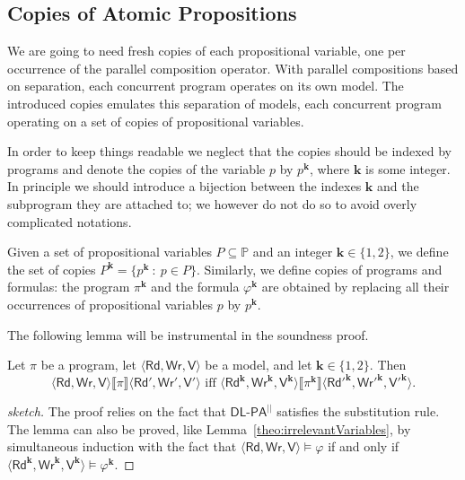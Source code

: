 \documentclass{llncs}
\newcommand{\cp}[2]{{#2}^\mathbf{#1}}
\newcommand{\pll}{ {||} }							%
\newcommand{\readset}{\mathsf{Rd}}
\newcommand{\valuset}{\mathsf{V}}
\newcommand{\writeset}{\mathsf{Wr}}
\newcommand{\DlpaPll}{\ensuremath{\mathsf{DL\text{-}PA}^\pll}\xspace}
\newcommand{\intPgm}[1]{\llbracket #1 \rrbracket}
\renewcommand{\phi}{\varphi}
\newcommand{\propset}{\mathbb P}
\newcommand{\propsetOf}[1]{\propset_{#1}}
\newcommand{\set}[1]{\{#1\}}
\newcommand{\suchthat}{~ : ~}
\newcommand{\tuple}[1]{ \langle #1 \rangle}
\begin{document}
\subsection{Copies of Atomic Propositions}\label{sec:copyVars}

We are going to need fresh copies of each propositional variable, one per occurrence of the parallel composition operator. 
With parallel compositions based on separation, each concurrent program operates on its own model.
The introduced copies emulates this separation of models,
each concurrent program operating on a set of copies of propositional variables.

In order to keep things readable we neglect that the copies should be indexed by programs
and denote the copies of the variable $p$ by $\cp k p$, where $\mathbf{k}$ is some integer. 
In principle we should introduce a bijection between the indexes $\mathbf{k}$ and the subprogram they are attached to;
we however do not do so to avoid overly complicated notations.

Given a set of propositional variables $P \subseteq \propset$ and an integer $\mathbf{k} \in \set{1,2}$, we define the set of copies
$\cp{k} P = \{ \cp{k} p \suchthat p \in P\}$. 
Similarly, we define copies of programs and formulas:
the program $\cp{k} \pi$ and the formula $\cp{k} \phi$ are obtained by replacing all their occurrences of
propositional variables $p$ by $\cp k p$. 

The following lemma will be instrumental in the soundness proof. 

\begin{lemma}\label{theo:copies}
Let $\pi$ be a program, 
let $\tuple{\readset,\writeset,\valuset}$ be a model, and 
let $\mathbf{k} \in \set{1,2}$. 
Then 
$$ \tuple{\readset,\writeset,\valuset} \intPgm{\pi} \tuple{\readset',\writeset',\valuset'} \text{ iff } 
\tuple{ \cp k {\readset},\cp k {\writeset},\cp k {\valuset}} \intPgm{\cp k \pi} \tuple{\cp k {\readset'},\cp k {\writeset'},\cp k {\valuset'}} . $$
\end{lemma}
\begin{proof}[sketch]
The proof relies on the fact that \DlpaPll satisfies the substitution rule.
The lemma can also be proved, like Lemma~\ref{theo:irrelevantVariables}, by simultaneous induction with the fact that
$\tuple{\readset, \writeset, \valuset} \models \phi$ if and only if
$\tuple{\cp k \readset, \cp k \writeset, \cp k \valuset} \models \cp k \phi$.
\end{proof}
\end{document}
